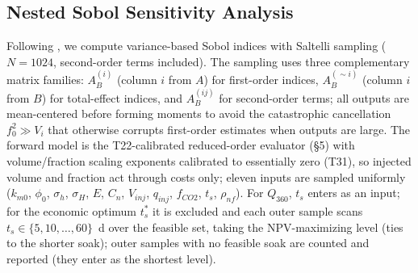 \subsection{Nested Sobol Sensitivity Analysis}
Following \cite{p4-02}, we compute variance-based Sobol indices with
Saltelli sampling ($N = 1024$, second-order terms included). The sampling
uses three complementary matrix families: $A_B^{(i)}$ (column $i$ from $A$)
for first-order indices, $A_B^{(\sim i)}$ (column $i$ from $B$) for
total-effect indices, and $A_B^{(ij)}$ for second-order terms; all outputs
are mean-centered before forming moments to avoid the catastrophic
cancellation $f_0^2 \gg V_i$ that otherwise corrupts first-order estimates
when outputs are large. The forward model is the T22-calibrated
reduced-order evaluator (\S5) with volume/fraction scaling exponents
calibrated to essentially zero (T31), so injected volume and fraction act
through costs only; eleven inputs are sampled uniformly ($k_{m0}$,
$\phi_0$, $\sigma_h$, $\sigma_H$, $E$, $C_n$, $V_{inj}$, $q_{inj}$,
$f_{CO2}$, $t_s$, $\rho_{nf}$). For $Q_{360}$, $t_s$ enters as an input; for the
economic optimum $t_s^*$ it is excluded and each outer sample scans
$t_s \in \{5, 10, \dots, 60\}$~d over the feasible set, taking the
NPV-maximizing level (ties to the shorter soak); outer samples with no
feasible soak are counted and reported (they enter as the shortest level).

